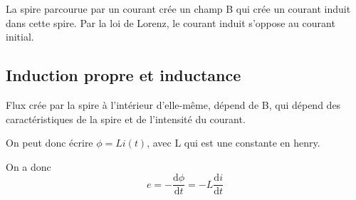 \documentclass[french]{yLectureNote}
\newcommand{\dd}{\mathrm{d}}
\begin{document}
\begin{definition}
    La spire parcourue par un courant crée un champ B qui crée un courant induit dans cette spire.
    Par la loi de Lorenz, le courant induit s'oppose au courant initial.
\end{definition}
\subsection{Induction propre et inductance}
\begin{definition}
    Flux crée par la spire à l'intérieur d'elle-m\^eme, dépend de B, qui dépend des caractéristiques
    de la spire et de l'intensité du courant.
\end{definition}
On peut donc écrire $\phi = L i(t)$, avec L qui est une constante en henry. 

On a donc $$e= -\frac{\dd \phi}{\dd t} = -L\frac{\dd i}{\dd t}$$
\end{document}
